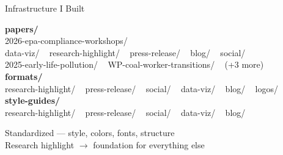 \documentclass[10pt,aspectratio=169]{beamer}
\begin{document}
\begin{frame}{Infrastructure I Built}
  \begin{center}
  \begin{tcolorbox}[colback=eilpaper,colframe=eilwarmrule,arc=3pt,boxrule=0.6pt,
                     width=0.92\textwidth,left=10pt,right=10pt,top=6pt,bottom=6pt]
    \ttfamily\footnotesize
    \textcolor{eilmaroon}{\textbf{papers/}}\\
    \hspace{1em}2026-epa-compliance-workshops/\\
    \hspace{2em}data-viz/ ~ research-highlight/ ~ press-release/ ~ blog/ ~ social/\\
    \hspace{1em}2025-early-life-pollution/ ~ WP-coal-worker-transitions/ ~ (+3 more)\\[4pt]
    \textcolor{eilmaroon}{\textbf{formats/}}\\
    \hspace{1em}research-highlight/ ~ press-release/ ~ social/ ~ data-viz/ ~ blog/ ~ logos/\\[4pt]
    \textcolor{eilmaroon}{\textbf{style-guides/}}\\
    \hspace{1em}research-highlight/ ~ press-release/ ~ social/ ~ data-viz/ ~ blog/
  \end{tcolorbox}
  \end{center}

  \vspace{8pt}
  \centering
  Standardized --- style, colors, fonts, structure\\
  Research highlight $\rightarrow$ foundation for everything else
\end{frame}
\end{document}
